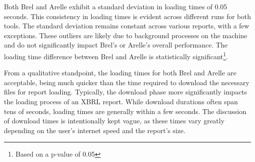 Both Brel and Arelle exhibit a standard deviation in loading times of 0.05 seconds.
This consistency in loading times is evident across different runs for both tools.
The standard deviation remains constant across various reports, with a few exceptions.
These outliers are likely due to background processes on the machine and do not significantly impact Brel's or Arelle's overall performance.
The loading time difference between Brel and Arelle is statistically significant\footnote{Based on a p-value of 0.05}.




From a qualitative standpoint, the loading times for both Brel and Arelle are acceptable,
being much quicker than the time required to download the necessary files for report loading.
Typically, the download phase more significantly impacts the loading process of an XBRL report.
While download durations often span tens of seconds, loading times are generally within a few seconds.
The discussion of download times is intentionally kept vague, as these times vary greatly depending on the user's internet speed and the report's size.
